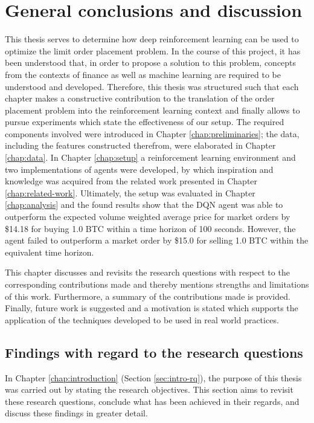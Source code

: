 \chapter{General conclusions and discussion}
\label{chap:discussion}

This thesis serves to determine how deep reinforcement learning can be used to optimize the limit order placement problem.
In the course of this project, it has been understood that, in order to propose a solution to this problem, concepts from the contexts of finance as well as machine learning are required to be understood and developed.
Therefore, this thesis was structured such that each chapter makes a constructive contribution to the translation of the order placement problem into the reinforcement learning context and finally allows to pursue experiments which state the effectiveness of our setup.
The required components involved were introduced in Chapter \ref{chap:preliminaries}; the data, including the features constructed therefrom, were elaborated in Chapter \ref{chap:data}.
In Chapter \ref{chap:setup} a reinforcement learning environment and two implementations of agents were developed, by which inspiration and knowledge was acquired from the related work presented in Chapter \ref{chap:related-work}.
Ultimately, the setup was evaluated in Chapter \ref{chap:analysis} and the found results show that the DQN agent was able to outperform the expected volume weighted average price for market orders by \$14.18 for buying 1.0 BTC within a time horizon of 100 seconds.
However, the agent failed to outperform a market order by \$15.0 for selling 1.0 BTC within the equivalent time horizon.

This chapter discusses and revisits the research questions with respect to the corresponding contributions made and thereby mentions strengths and limitations of this work.
Furthermore, a summary of the contributions made is provided.
Finally, future work is suggested and a motivation is stated which supports the application of the techniques developed to be used in real world practices.

\section{Findings with regard to the research questions}

In Chapter \ref{chap:introduction} (Section \ref{sec:intro-rq}), the purpose of this thesis was carried out by stating the research objectives.
This section aims to revisit these research questions, conclude what has been achieved in their regards, and discuss these findings in greater detail.

